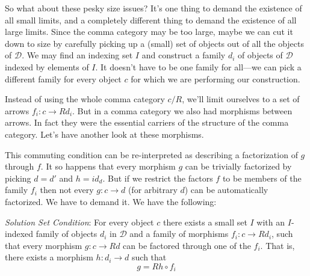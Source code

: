 \documentclass[11pt]{amsart}
\newcommand{\cat}[1]{\mathcal{#1}}
\begin{document}
So what about these pesky size issues? It's one thing to demand the existence of all small limits, and a completely different thing to demand the existence of all large limits. Since the comma category may be too large, maybe we can cut it down to size by carefully picking up a (small) set of objects out of all the objects of $\cat D$. We may find an indexing set $I$ and construct a family $d_i$ of objects of $\cat D$ indexed by elements of $I$. It doesn't have to be one family for all---we can pick a different family for every object $c$ for which we are performing our construction. 

Instead of using the whole comma category $c/R$, we'll limit ourselves to a set of arrows $f_i \colon c \to R d_i$. But in a comma category we also had morphisms between arrows. In fact they were the essential carriers of the structure of the comma category. Let's have another look at these morphisms.

\begin{figure}[H]
\centering
\end{figure}

This commuting condition can be re-interpreted as describing a factorization of $g$ through $f$. It so happens that every morphism $g$ can be trivially factorized by  picking $d = d'$ and $h = id_d$. But if we restrict the factors $f$ to be members of the family $f_i$ then not every $g \colon c \to d$  (for arbitrary $d$) can be automatically factorized. We have to demand it. We have the following:

\emph{Solution Set Condition}: For every object $c$ there exists a small set $I$ with an $I$-indexed family of objects $d_i$ in $\cat D$ and a family of morphisms $f_i \colon c \to R d_i$, such that every morphism $g \colon c \to R d$ can be factored through one of the $f_i$. That is, there exists a morphism $h \colon d_i \to d$ such that
\[g = R h \circ f_i \]
\end{document}
